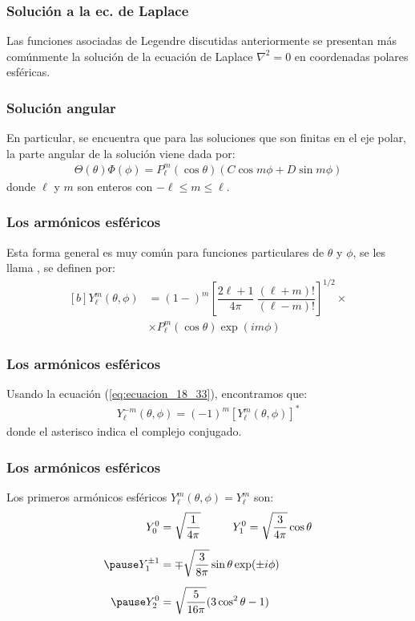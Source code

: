 \documentclass[12pt]{beamer}
\begin{document}
\begin{frame}
\frametitle{Solución a la ec. de Laplace}
Las funciones asociadas de Legendre discutidas anteriormente se presentan más comúnmente la solución de la ecuación de Laplace $\nabla^{2} =0$ en coordenadas polares esféricas.
\end{frame}
\begin{frame}
\frametitle{Solución angular}
En particular, se encuentra que para las soluciones que son finitas en el eje polar, la parte angular de la solución viene dada por:
\pause
\begin{align*}
\Theta (\theta) \Phi (\phi) = P_{\ell}^{m} (\cos \theta) (C \cos m \phi + D \sin m \phi)
\end{align*}
donde $\ell$ y $m$ son enteros con $- \ell \leq m \leq \ell$.
\end{frame}
\begin{frame}
\frametitle{Los armónicos esféricos}
Esta forma general es muy común para funciones particulares de $\theta$ y $\phi$, se les llama , se definen por:
\pause
\begin{equation}
\begin{aligned}[b]
Y_{\ell}^{m} (\theta, \phi) &= (1-)^{m} \left[ \dfrac{2 \ell + 1}{4 \pi} \: \dfrac{(\ell + m)!}{(\ell - m)!} \right]^{1/2} \times \\[0.5em]
&\times P_{\ell}^{m} (\cos \theta) \exp(i m \phi)
\end{aligned}
\label{eq:ecuacion_045}
\end{equation}
\end{frame}
\begin{frame}
\frametitle{Los armónicos esféricos}    
Usando la ecuación (\ref{eq:ecuacion_18_33}), encontramos que:
\pause
\begin{align*}
Y_{\ell}^{-m} (\theta, \phi) =  (-1)^{m} \left[ Y_{\ell}^{m} (\theta,\phi) \right]^{*}
\end{align*}
donde el asterisco indica el complejo conjugado.
\end{frame}
\begin{frame}
\frametitle{Los armónicos esféricos}
Los primeros armónicos esféricos $Y_{\ell}^{m}(\theta,\phi) = Y_{\ell}^{m}$ son:
\pause
\begin{eqnarray*}
\begin{aligned}
Y_{0}^{0} &= \sqrt{\dfrac{1}{4 \pi}} \hspace{1cm} Y_{1}^{0} = \sqrt{\dfrac{3}{4 \pi}} \cos \theta \\[0.5em] \pause
Y_{1}^{\pm 1} &= \mp \sqrt{\dfrac{3}{8 \pi}} \sin \theta \exp(\pm i \phi) \\[0.5em] \pause
Y_{2}^{0} &= \sqrt{\dfrac{5}{16 \pi}} ( 3 \cos^{2} \theta - 1) \\[0.5em]
\end{aligned}
\end{eqnarray*}
\end{frame}
\end{document}
